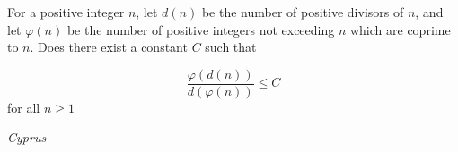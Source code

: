 For a positive integer $n$, let $d(n)$ be the number of positive divisors of $n$, and let $\varphi(n)$ be the number of positive integers not exceeding $n$ which are coprime to $n$. Does there exist a constant $C$ such that

$$ \frac {\varphi ( d(n))}{d(\varphi(n))}\le C$$for all $n\ge 1$

\textit{Cyprus}